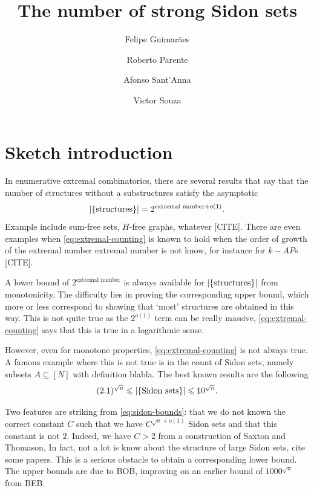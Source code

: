 \documentclass[reqno,a4paper,12pt]{amsart}
\begin{document}
\title{The number of strong Sidon sets}

\author{Felipe Guimarães}
\author{Roberto Parente}
\author{Afonso Sant'Anna}
\author{Victor Souza}



\maketitle


\section{Sketch introduction}

In enumerative extremal combinatorics, there are several results that say that the number of structures without a substructures satisfy the asymptotic
\begin{equation}
    \label{eq:extremal-counting}
    \lvert\lbrace\text{structures}\rbrace\rvert = 2^{\text{extremal number} + o(1)}.
\end{equation}
Example include sum-free sets, $H$-free graphs, whatever [CITE].
There are even examples when \eqref{eq:extremal-counting} is known to hold when the order of growth of the extremal number $\text{extremal number}$ is not know, for instance for $k-AP$s [CITE].

A lower bound of $2^{\text{extremal number}}$ is always available for $\lvert\lbrace\text{structures}\rbrace\rvert$ from monotonicity.
The difficulty lies in proving the corresponding upper bound, which more or less correspond to showing that `most' structures are obtained in this way.
This is not quite true as the $2^{o(1)}$ term can be really massive, \eqref{eq:extremal-counting} says that this is true in a logarithmic sense.

However, even for monotone properties, \eqref{eq:extremal-counting} is not always true.
A famous example where this is not true is in the count of Sidon sets, namely subsets $A \subseteq [N]$ with definition blabla.
The best known results are the following
\begin{equation}
    \label{eq:sidon-bounds}
    (2.1)^{\sqrt{n}} \leqslant \lvert\lbrace\text{Sidon sets}\rbrace\rvert \leqslant 10^{\sqrt{n}}.
\end{equation}

Two features are striking from \eqref{eq:sidon-bounds}: that we do not known the correct constant $C$ such that we have $C^{\sqrt{n} + o(1)}$ Sidon sets and that this constant is not $2$.
Indeed, we have $C > 2$ from a construction of Saxton and Thomason,
In fact, not a lot is know about the structure of large Sidon sets, cite some papers.
This is a serious obstacle to obtain a corresponding lower bound.
The upper bounds are due to BOB, improving on an earlier bound of $1000^{\sqrt{n}}$ from BEB.
\end{document}
